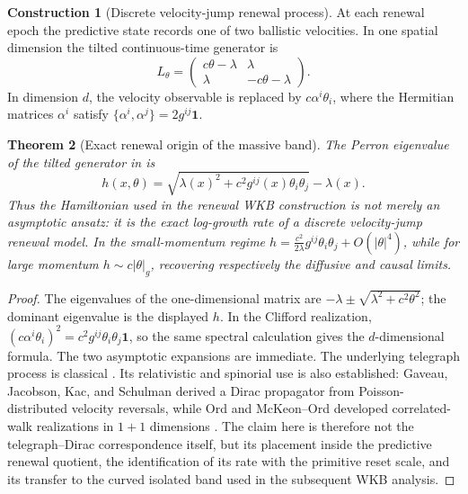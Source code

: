 \documentclass[11pt]{article}
\newtheorem{theorem}{Theorem}[section]
\theoremstyle{definition}
\newtheorem{construction}[theorem]{Construction}
\theoremstyle{remark}
\begin{document}
\begin{construction}[Discrete velocity-jump renewal process]
\label{constr:velocity-jump}
At each renewal epoch the predictive state records one of two ballistic
velocities.  In one spatial dimension the tilted continuous-time generator is
\[
 L_\theta=
 \begin{pmatrix}
 c\theta-\lambda&\lambda\\
 \lambda&-c\theta-\lambda
 \end{pmatrix}.
\]
In dimension $d$, the velocity observable is replaced by
$c\alpha^i\theta_i$, where the Hermitian matrices $\alpha^i$ satisfy
$\{\alpha^i,\alpha^j\}=2g^{ij}\mathbf 1$.
\end{construction}

\begin{theorem}[Exact renewal origin of the massive band]
\label{thm:exact-renewal-band}
The Perron eigenvalue of the tilted generator in
 is
\[
 h(x,\theta)=\sqrt{\lambda(x)^2+c^2g^{ij}(x)\theta_i\theta_j}-\lambda(x).
\]
Thus the Hamiltonian used in the renewal WKB construction is not merely an
asymptotic ansatz: it is the exact log-growth rate of a discrete velocity-jump
renewal model.  In the small-momentum regime
$h=\frac{c^2}{2\lambda}g^{ij}\theta_i\theta_j+O(|\theta|^4)$, while for large
momentum $h\sim c|\theta|_g$, recovering respectively the diffusive and causal
limits.
\end{theorem}

\begin{proof}
The eigenvalues of the one-dimensional matrix are
$-\lambda\pm\sqrt{\lambda^2+c^2\theta^2}$; the dominant eigenvalue is the
displayed $h$.  In the Clifford realization,
$(c\alpha^i\theta_i)^2=c^2g^{ij}\theta_i\theta_j\mathbf1$, so the same spectral
calculation gives the $d$-dimensional formula.  The two asymptotic expansions are
immediate.  The underlying telegraph process is classical \cite{GoldsteinKac,Kac}.
Its relativistic and spinorial use is also established: Gaveau, Jacobson, Kac,
and Schulman derived a Dirac propagator from Poisson-distributed velocity
reversals, while Ord and McKeon--Ord developed correlated-walk realizations in
$1+1$ dimensions \cite{GaveauJacobsonKacSchulman,Ord1983,McKeonOrd}.  The claim
here is therefore not the telegraph--Dirac correspondence itself, but its
placement inside the predictive renewal quotient, the identification of its
rate with the primitive reset scale, and its transfer to the curved isolated
band used in the subsequent WKB analysis.
\end{proof}
\end{document}
